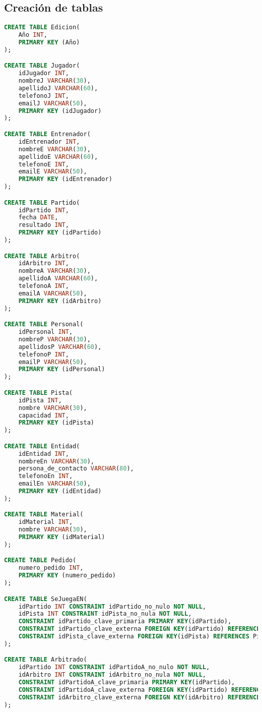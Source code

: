 \subsection{Creación de tablas}
\begin{lstlisting}[language=sql]
CREATE TABLE Edicion(
	Año INT,
	PRIMARY KEY (Año)
);

CREATE TABLE Jugador(
	idJugador INT,
	nombreJ VARCHAR(30),
	apellidoJ VARCHAR(60),
	telefonoJ INT,
	emailJ VARCHAR(50),
	PRIMARY KEY (idJugador)
);

CREATE TABLE Entrenador(
	idEntrenador INT,
	nombreE VARCHAR(30),
	apellidoE VARCHAR(60),
	telefonoE INT,
	emailE VARCHAR(50),
	PRIMARY KEY (idEntrenador)
);

CREATE TABLE Partido(
	idPartido INT,
	fecha DATE,
	resultado INT,
	PRIMARY KEY (idPartido)
);

CREATE TABLE Arbitro(
	idArbitro INT,
	nombreA VARCHAR(30),
	apellidoA VARCHAR(60),
	telefonoA INT,
	emailA VARCHAR(50),
	PRIMARY KEY (idArbitro)
);

CREATE TABLE Personal(
	idPersonal INT,
	nombreP VARCHAR(30),
	apellidosP VARCHAR(60),
	telefonoP INT,
	emailP VARCHAR(50),
	PRIMARY KEY (idPersonal)
);

CREATE TABLE Pista(
	idPista INT,
	nombre VARCHAR(30),
	capacidad INT,
	PRIMARY KEY (idPista)
);

CREATE TABLE Entidad(
	idEntidad INT,
	nombreEn VARCHAR(30),
	persona_de_contacto VARCHAR(80),
	telefonoEn INT,
	emailEn VARCHAR(50),
	PRIMARY KEY (idEntidad)
);

CREATE TABLE Material(
	idMaterial INT,
	nombre VARCHAR(30),
	PRIMARY KEY (idMaterial)
);

CREATE TABLE Pedido(
	numero_pedido INT,
	PRIMARY KEY (numero_pedido)
);

CREATE TABLE SeJuegaEN(
	idPartido INT CONSTRAINT idPartido_no_nulo NOT NULL,
	idPista INT CONSTRAINT idPista_no_nula NOT NULL,
	CONSTRAINT idPartido_clave_primaria PRIMARY KEY(idPartido),
	CONSTRAINT idPartido_clave_externa FOREIGN KEY(idPartido) REFERENCES Partido(idPartido),
	CONSTRAINT idPista_clave_externa FOREIGN KEY(idPista) REFERENCES Pista(idPista)
);

CREATE TABLE Arbitrado(
	idPartido INT CONSTRAINT idPartidoA_no_nulo NOT NULL,
	idArbitro INT CONSTRAINT idArbitro_no_nula NOT NULL,
	CONSTRAINT idPartidoA_clave_primaria PRIMARY KEY(idPartido),
	CONSTRAINT idPartidoA_clave_externa FOREIGN KEY(idPartido) REFERENCES Partido(idPartido),
	CONSTRAINT idArbitro_clave_externa FOREIGN KEY(idArbitro) REFERENCES Arbitro(idArbitro)
);


\end{lstlisting}
